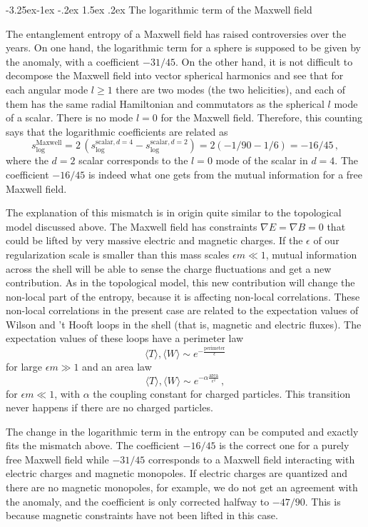 \documentclass[11pt,a4paper]{article}
\makeatletter
\renewcommand\subsection{\@startsection{subsection}{2}{\z@}%
                                   {-3.25ex\@plus -1ex \@minus -.2ex}%
                                     {1.5ex \@plus .2ex}%
                                     {\normalfont\bfseries}}
\numberwithin{equation}{section}
\newcommand{\be}{\begin{equation}}
\newcommand{\ee}{\end{equation}}
\makeatother
\begin{document}
\subsection{The logarithmic term of the Maxwell field}

The entanglement entropy of a Maxwell field has raised controversies over the years.  
On one hand, the logarithmic term for a sphere is supposed to be given by the anomaly, with a coefficient $-31/45$. On the other hand, it is not difficult to decompose the  Maxwell field into vector spherical harmonics and see that for each angular mode $l\ge 1$ there are two modes (the two helicities), and each of them has the same radial Hamiltonian and commutators as the spherical $l$ mode of a scalar. There is no mode $l=0$ for the Maxwell field.  Therefore, this counting says that the logarithmic coefficients are related as 
\be
s^{\textrm{Maxwell}}_{\textrm{log}}=2\,(s^{\textrm{scalar}, d=4}_{\textrm{log}}- s^{\textrm{scalar}, d=2}_{\textrm{log}})=2(-1/90-1/6)=-16/45\,,   
\ee
where the $d=2$ scalar corresponds to the $l=0$ mode of the scalar in $d=4$. 
The coefficient $-16/45$ is indeed what one gets from the mutual information for a free Maxwell field.

The explanation of this mismatch is in origin quite similar to the topological model discussed above. The Maxwell field has constraints $\nabla E=\nabla B=0$ that could be lifted by very massive electric and magnetic charges. If the $\epsilon$ of our regularization scale is smaller than this mass scales $\epsilon m\ll 1$, mutual information across the shell will be able to sense the charge fluctuations and get a new contribution. As in the topological model, this new contribution will change the non-local part of the entropy, because it is affecting non-local correlations. These non-local correlations in the present case are related to the expectation values of Wilson and 't Hooft loops in the shell (that is, magnetic and electric fluxes). The expectation values of these loops have a perimeter law
\be\label{perr}
\langle T \rangle,\langle W \rangle \sim e^{-\frac{\textrm{perimeter}}{\epsilon}}
\ee  
for large $\epsilon m \gg 1$ and an area law 
\be \label{arr}
\langle T \rangle,\langle W \rangle \sim e^{-\alpha \frac{\textrm{area}}{\epsilon^2}}\,,
\ee 
for $\epsilon m \ll 1$, with $\alpha$ the coupling constant for charged particles. This transition never happens if there are no charged particles. 

The change in the logarithmic term in the entropy can be computed and exactly fits the mismatch above. The coefficient $-16/45$ is the correct one for a purely free Maxwell field while $-31/45$ corresponds to a Maxwell field interacting with electric charges and magnetic monopoles. If electric charges are quantized and there are no magnetic monopoles, for example, we do not get an agreement with the anomaly, and the coefficient is only corrected halfway to $-47/90$. This is because magnetic constraints have not been lifted in this case.  
\end{document}
